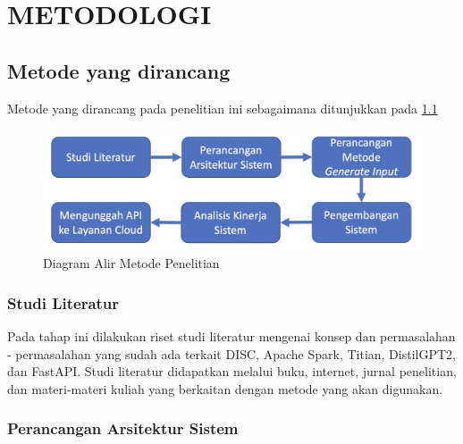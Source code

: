 \chapter{METODOLOGI}
\label{chap:metodologi}

\section{Metode yang dirancang}
\label{sec:metode yang dirancang}

Metode yang dirancang pada penelitian ini sebagaimana ditunjukkan pada \ref{fig:metode}

\begin{figure}[H]
  \centering
  \includegraphics[scale=0.26]{gambar/DiagramAlirMetodePenelitian.jpg}

  \caption{Diagram Alir Metode Penelitian}
  \label{fig:metode}
\end{figure}

\subsection{Studi Literatur}
\label{subsec:studiliteratur}

  
  Pada tahap ini dilakukan riset studi literatur mengenai konsep 
  dan permasalahan - permasalahan yang sudah ada terkait DISC, 
  Apache Spark, Titian, DistilGPT2, dan FastAPI. Studi literatur didapatkan melalui buku, internet, jurnal penelitian, dan materi-materi kuliah yang berkaitan dengan metode yang akan digunakan.

  \subsection{Perancangan Arsitektur Sistem}
  \label{subsec:perancanganarsitektursistem}
  
